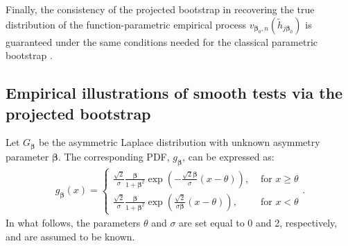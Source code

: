 \documentclass[11pt]{article}
\newcommand{\vect}[1]{\boldsymbol{#1}}
\begin{document}
Finally, the consistency of the projected bootstrap in recovering the true distribution of the function-parametric empirical process $v_{\vect{\beta}_0,n}(\widetilde{h}_{j\vect{\beta}_0})$ is guaranteed under the same conditions needed for the classical parametric bootstrap \citep[cfr.][]{babu2004}. 



\subsection{Empirical illustrations of smooth tests via the projected bootstrap} \label{sec:3.1}
Let $G_{\vect{\beta}}$  be the asymmetric Laplace distribution with unknown asymmetry parameter $\vect{\beta}$. The corresponding PDF, $g_{\vect{\beta}}$, can be expressed as:
\begin{equation}
    \begin{aligned}
g_{\vect{\beta}}(x)=\begin{cases}\frac{\sqrt{2}}{\sigma} \frac{\vect{\beta}}{1+\vect{\beta}^2} \exp \left(-\frac{\sqrt{2} \vect{\beta}}{\sigma}(x-\theta)\right), & \text { for }  x \geq \theta \\ \frac{\sqrt{2}}{\sigma} \frac{\vect{\beta}}{1+\vect{\beta}^2} \exp \left(\frac{\sqrt{2}}{\sigma \vect{\beta}}(x-\theta)\right), & \text { for }  x<\theta\end{cases}.
\label{eqn:den}
    \end{aligned}
\end{equation}
In what follows, the parameters $\theta$ and $\sigma$ are set equal to 0 and 2, respectively, and are assumed to be known.
\end{document}
